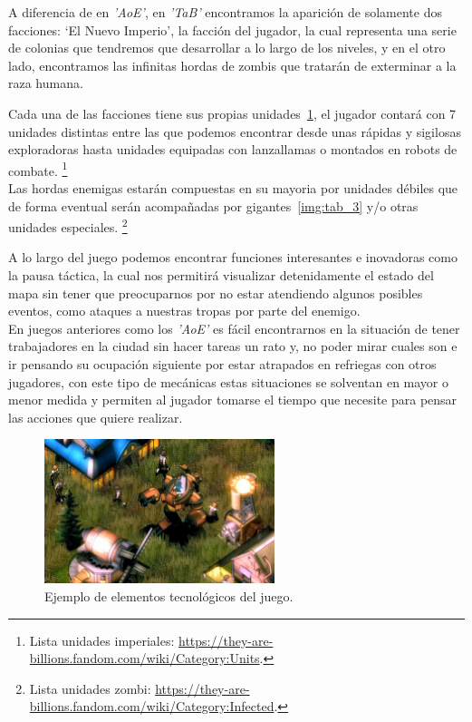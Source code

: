 A diferencia de en \textit{'\ac{AoE}'}, en \textit{'\ac{TaB}'} encontramos la aparición de solamente dos facciones:
`El Nuevo Imperio', la facción del jugador, la cual representa una 
serie de colonias que tendremos que desarrollar a lo largo de los niveles, y en el otro lado, 
encontramos las infinitas hordas de zombis que tratarán de exterminar a la raza humana.

Cada una de las facciones tiene sus propias unidades~\ref{img:tab_2}, el jugador contará con 7 unidades distintas
entre las que podemos encontrar desde unas rápidas y sigilosas exploradoras hasta unidades equipadas
con lanzallamas o montados en robots de combate. \footnote{Lista unidades imperiales: \url{https://they-are-billions.fandom.com/wiki/Category:Units}.}
\\Las hordas enemigas estarán compuestas en su mayoria por unidades débiles que de forma eventual
serán acompañadas por gigantes~\ref{img:tab_3} y/o otras unidades especiales.
\footnote{Lista unidades zombi: \url{https://they-are-billions.fandom.com/wiki/Category:Infected}.}

A lo largo del juego podemos encontrar funciones interesantes e inovadoras como la pausa
táctica, la cual nos permitirá visualizar detenidamente el estado del mapa sin tener que
preocuparnos por no estar atendiendo algunos posibles eventos, como ataques a nuestras
tropas por parte del enemigo.\\ 
En juegos anteriores como los \textit{'\ac{AoE}'} es
fácil encontrarnos en la situación de tener trabajadores en la ciudad sin hacer tareas
un rato y, no poder mirar cuales son e ir pensando su ocupación siguiente por estar
atrapados en refriegas con otros jugadores, con este tipo de mecánicas estas situaciones
se solventan en mayor o menor medida y permiten al jugador tomarse el tiempo que
necesite para pensar las acciones que quiere realizar.

\begin{figure}[ht]
\centering
\includegraphics[width=0.6\textwidth]{imagenes/marco_teo/referentes/tab_2.png}
\caption{Ejemplo de elementos tecnológicos del juego.}
\label{img:tab_2}
\end{figure}

